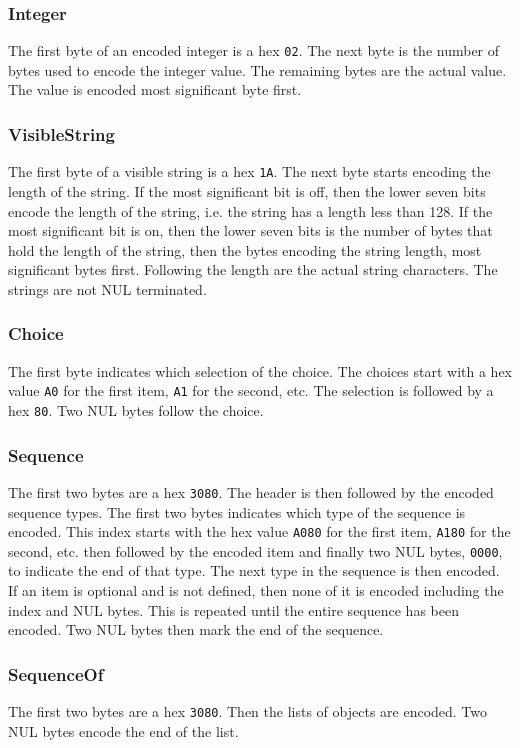 \subsubsection{Integer}

The first byte of an encoded integer is a hex \verb+02+.  The next byte 
is the number of bytes used to encode the integer value.  The 
remaining bytes are the actual value.  The value is encoded 
most significant byte first.

\subsubsection{VisibleString}

The first byte of a visible string is a hex \verb+1A+.  
The next byte 
starts encoding the length of the string.  If the most 
significant bit is off, then the lower seven bits encode the 
length of the string, i.e. the string has a length less than 128. 
If the most significant bit is on, then 
the lower seven bits is the number of bytes that hold the length of 
the string, then the bytes encoding the string length, most significant 
bytes first.
Following the length are the actual string characters.
The strings are not NUL terminated.  

\subsubsection{Choice}


The first byte indicates which selection of the choice.  The choices 
start with a hex value \verb+A0+ for the first item, \verb+A1+ for 
the second, etc.  
The selection is followed by a hex \verb+80+.  Two NUL bytes follow 
the choice.

\subsubsection{Sequence}

The first two bytes are a hex \verb+3080+.  The header is 
then followed by 
the encoded sequence types.  The first two bytes indicates which type 
of the sequence is encoded.  This index starts with the hex value 
\verb+A080+ 
for the first item, \verb+A180+ for the second, etc. then 
followed by the 
encoded item and finally two NUL bytes, \verb+0000+, to indicate the end 
of that type.  The next type in the sequence is then encoded.  If an 
item is optional and is not defined, then none of it is encoded 
including the index and NUL bytes.  This is repeated until the entire 
sequence has been encoded.  Two NUL bytes then mark the end of the 
sequence.

\subsubsection{SequenceOf}

The first two bytes are a hex \verb+3080+.  Then the lists of objects are 
encoded.  Two NUL bytes encode the end of the list.
